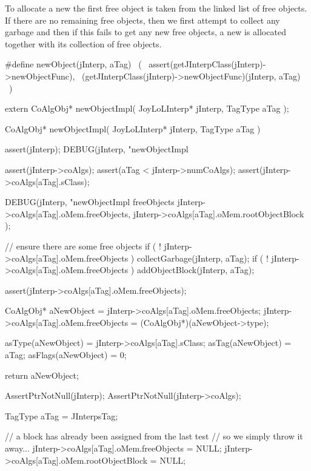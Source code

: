 \startTestSuite[newObject]

To allocate a new  the first free object is taken from 
the linked list of free objects. If there are no remaining free objects, 
then we first attempt to collect any garbage and then if this fails to get 
any new free objects, a new  is allocated together with 
its collection of free objects. 

\startCHeader
#define newObject(jInterp, aTag)                              \
  (                                                           \
    assert(getJInterpClass(jInterp)->newObjectFunc),          \
    (getJInterpClass(jInterp)->newObjectFunc)(jInterp, aTag)  \
  )
\stopCHeader

\setCHeaderStream{private}
\startCHeader
extern CoAlgObj* newObjectImpl(
  JoyLoLInterp* jInterp,
  TagType aTag
);
\stopCHeader
{}

\startCCode
CoAlgObj* newObjectImpl(
  JoyLoLInterp* jInterp,
  TagType aTag
) {
  assert(jInterp);
  DEBUG(jInterp, "newObjectImpl %
  
  assert(jInterp->coAlgs);
  assert(aTag < jInterp->numCoAlgs);
  assert(jInterp->coAlgs[aTag].sClass);

  DEBUG(jInterp, "newObjectImpl freeObjects %
    jInterp->coAlgs[aTag].oMem.freeObjects,
    jInterp->coAlgs[aTag].oMem.rootObjectBlock
  ); 

  // ensure there are some free objects
  if ( ! jInterp->coAlgs[aTag].oMem.freeObjects ) 
    collectGarbage(jInterp, aTag);
  if ( ! jInterp->coAlgs[aTag].oMem.freeObjects )
    addObjectBlock(jInterp, aTag);

  assert(jInterp->coAlgs[aTag].oMem.freeObjects);

  CoAlgObj* aNewObject   = jInterp->coAlgs[aTag].oMem.freeObjects;
  jInterp->coAlgs[aTag].oMem.freeObjects = (CoAlgObj*)(aNewObject->type);

  asType(aNewObject)  = jInterp->coAlgs[aTag].sClass;
  asTag(aNewObject)   = aTag;
  asFlags(aNewObject) = 0;

  return aNewObject;
}
\stopCCode

\startCTest
  AssertPtrNotNull(jInterp);
  AssertPtrNotNull(jInterp->coAlgs);

  TagType aTag = JInterpsTag;
  
  // a block has already been assigned from the last test
  // so we simply throw it away...
  jInterp->coAlgs[aTag].oMem.freeObjects = NULL;
  jInterp->coAlgs[aTag].oMem.rootObjectBlock = NULL;

